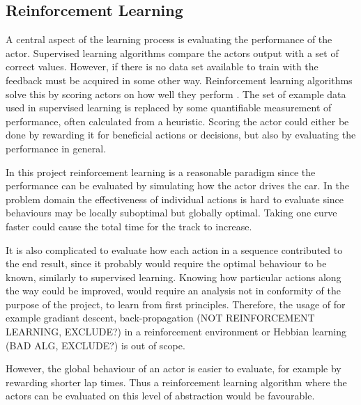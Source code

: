 \subsection{Reinforcement Learning}
A central aspect of the learning process is evaluating the performance of the actor. Supervised learning algorithms compare the actors output with a set of correct values. However, if there is no data set available to train with the feedback must be acquired in some other way. Reinforcement learning algorithms solve this by scoring actors on how well they perform \cite{whiteson}. The set of example data used in supervised learning is replaced by some quantifiable measurement of performance, often calculated from a heuristic. Scoring the actor could either be done by rewarding it for beneficial actions or decisions, but also by evaluating the performance in general. 


In this project reinforcement learning is a reasonable paradigm since the performance can be evaluated by simulating how the actor drives the car. In the problem domain the effectiveness of individual actions is hard to evaluate since behaviours may be locally suboptimal but globally optimal. Taking one curve faster could cause the total time for the track to increase. 

It is also complicated to evaluate how each action in a sequence contributed to the end result, since it probably would require the optimal behaviour to be known, similarly to supervised learning. Knowing how particular actions along the way could be improved, would require an analysis not in conformity of the purpose of the project, to learn from first principles. Therefore, the usage of for example gradiant descent, back-propagation (NOT REINFORCEMENT LEARNING, EXCLUDE?) in a reinforcement environment or Hebbian learning (BAD ALG, EXCLUDE?) is out of scope.

However, the global behaviour of an actor is easier to evaluate, for example by rewarding shorter lap times. Thus a reinforcement learning algorithm where the actors can be evaluated on this level of abstraction would be favourable. 

